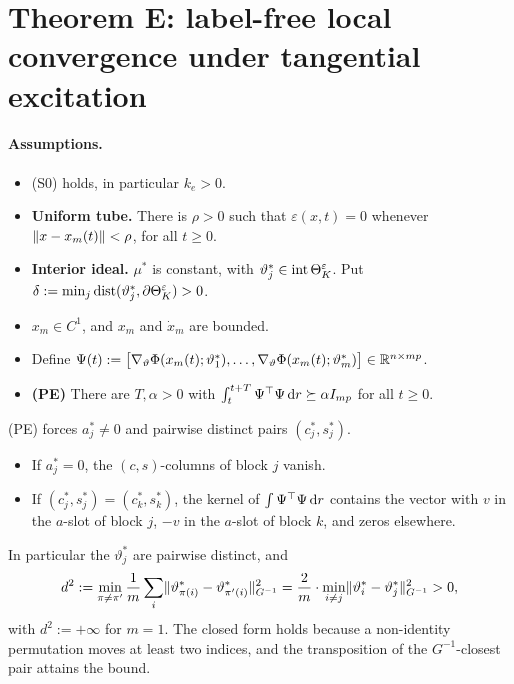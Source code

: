\section{Theorem E: label-free local convergence under tangential excitation}\label{sec:thmE}

\paragraph{Assumptions.}
\begin{itemize}
  \item (S0) holds, in particular $k_e>0$.
  \item \textbf{Uniform tube.} There is $\rho>0$ such that $\varepsilon(x,t)=0$ whenever $\lVert x-x_m(t)\rVert<\rho$, for
    all $t\ge0$.
  \item \textbf{Interior ideal.} $\mu^*$ is constant, with $\vartheta^*_j\in\operatorname{int}\Theta_K^{\varepsilon}$. Put
    $\delta:=\min_j\operatorname{dist}(\vartheta^*_j,\partial\Theta_K^{\varepsilon})>0$.
  \item $x_m\in C^1$, and $x_m$ and $\dot x_m$ are bounded.
  \item Define
    $\Psi(t):=\bigl[\nabla_\vartheta\Phi(x_m(t);\vartheta^*_1),\dots,\nabla_\vartheta\Phi(x_m(t);\vartheta^*_m)\bigr]
    \in\mathbb{R}^{n\times mp}$.
  \item \textbf{(PE)} There are $T,\alpha>0$ with $\int_t^{t+T}\Psi^\top\Psi\,\mathrm{d} r\succeq\alpha I_{mp}$ for all
    $t\ge0$.
\end{itemize}

(PE) forces $a^*_j\neq0$ and pairwise distinct pairs $(c^*_j,s^*_j)$.
\begin{itemize}
  \item If $a^*_j=0$, the $(c,s)$-columns of block $j$ vanish.
  \item If $(c^*_j,s^*_j)=(c^*_k,s^*_k)$, the kernel of $\int\Psi^\top\Psi\,\mathrm{d} r$ contains the vector with $v$ in the
    $a$-slot of block $j$, $-v$ in the $a$-slot of block $k$, and zeros elsewhere.
\end{itemize}
In particular the $\vartheta^*_j$ are pairwise distinct, and
\begin{equation}\label{eq:thmE:gap}
  d^2:=\min_{\pi\neq\pi'}\frac1m\sum_i\lVert \vartheta^*_{\pi(i)}-\vartheta^*_{\pi'(i)}\rVert^2_{G^{-1}}
  =\frac2m\cdot\min_{i\neq j}\lVert \vartheta^*_i-\vartheta^*_j\rVert^2_{G^{-1}}>0,
\end{equation}
with $d^2:=+\infty$ for $m=1$. The closed form holds because a non-identity permutation moves at least two indices,
and the transposition of the $G^{-1}$-closest pair attains the bound.

